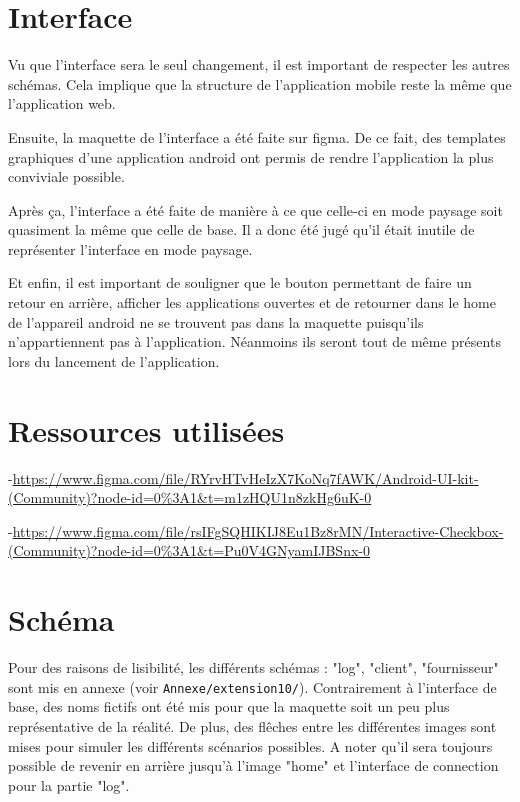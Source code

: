 \section{Interface}
\begin{flushleft}
Vu que l'interface sera le seul changement, il est important de respecter les autres schémas. Cela implique que la structure de l'application mobile reste la même que l'application web.
\end{flushleft}
\begin{flushleft}
Ensuite, la maquette de l'interface a été faite sur figma. De ce fait, des templates graphiques d'une application android ont permis de rendre l'application la plus conviviale possible.
\end{flushleft}
\begin{flushleft}
Après ça, l'interface a été faite de manière à ce que celle-ci en mode paysage soit quasiment la même que celle de base. Il a donc été jugé qu'il était inutile de représenter l'interface en mode paysage. 
\end{flushleft}
\begin{flushleft}
Et enfin, il est important de souligner que le bouton permettant de faire un retour en arrière, afficher les applications ouvertes et de retourner dans le home de l'appareil android ne se trouvent pas dans la maquette puisqu'ils n'appartiennent pas à l'application. Néanmoins ils seront tout de même présents lors du lancement de l'application.
\end{flushleft}
\newpage
\section{Ressources utilisées}
\begin{flushleft}
-\url{https://www.figma.com/file/RYrvHTvHeIzX7KoNq7fAWK/Android-UI-kit-(Community)?node-id=0\%3A1&t=m1zHQU1n8zkHg6uK-0}
\end{flushleft}
\begin{flushleft}
-\url{https://www.figma.com/file/rsIFgSQHIKIJ8Eu1Bz8rMN/Interactive-Checkbox-(Community)?node-id=0\%3A1&t=Pu0V4GNyamIJBSnx-0}
\end{flushleft}
\section{Schéma}
\begin{flushleft}
Pour des raisons de lisibilité, les différents schémas : "log", "client", "fournisseur" sont mis en annexe (voir \texttt{Annexe/extension10/}). Contrairement à l'interface de base, des noms fictifs ont été mis pour que la maquette soit un peu plus représentative de la réalité. De plus, des flêches entre les différentes images sont mises pour simuler les différents scénarios possibles. A noter qu'il sera toujours possible de revenir en arrière jusqu'à l'image "home" et l'interface de connection pour la partie "log".
\end{flushleft}
